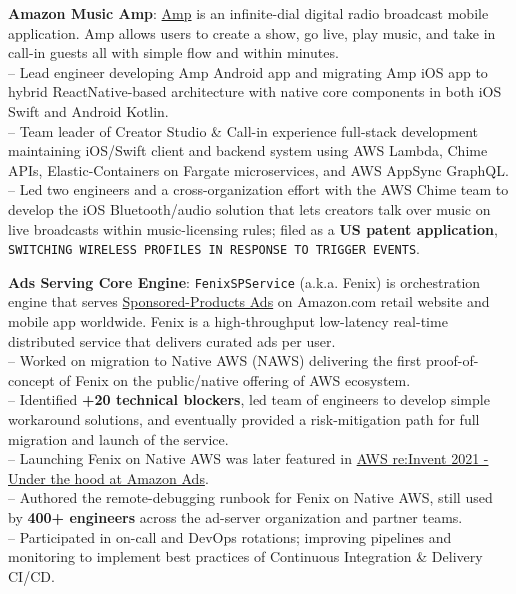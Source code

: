 \documentclass[letterpaper,11pt]{article}
\newcommand{\resumeItem}[2]{
  \item\small{
    \textbf{#1}{: #2\vspace{-2pt}}
  }
}
\begin{document}
		\resumeItem{Amazon Music Amp}
          {\href{https://techcrunch.com/2022/03/08/amazon-launches-a-live-radio-app-amp-which-lets-you-play-dj-with-the-amazon-music-catalog/}{Amp} is an infinite-dial digital radio broadcast mobile application. Amp allows users to create a show, go live, play music, and take in call-in guests all with simple flow and within minutes.\\
          -- Lead engineer developing Amp Android app and migrating Amp iOS app to hybrid ReactNative-based architecture with native core components in both iOS Swift and Android Kotlin.\\
          -- Team leader of Creator Studio \& Call-in experience full-stack development maintaining iOS/Swift client and backend system using AWS Lambda, Chime APIs, Elastic-Containers on Fargate microservices, and AWS AppSync GraphQL.\\
          -- Led two engineers and a cross-organization effort with the AWS Chime team to develop the iOS Bluetooth/audio solution that lets creators talk over music on live broadcasts within music-licensing rules; filed as a \textbf{US patent application}, \texttt{SWITCHING WIRELESS PROFILES IN RESPONSE TO TRIGGER EVENTS}.}          
		\resumeItem{Ads Serving Core Engine}
          {\texttt{FenixSPService} (a.k.a. Fenix) is orchestration engine that serves \href{https://advertising.amazon.com/solutions/products/sponsored-products}{Sponsored-Products Ads} on Amazon.com retail website and mobile app worldwide. Fenix is a high-throughput low-latency real-time distributed service that delivers curated ads per user.\\
          -- Worked on migration to Native AWS (NAWS) delivering the first proof-of-concept of Fenix on the public/native offering of AWS ecosystem.\\
          -- Identified \textbf{+20 technical blockers}, led team of engineers to develop simple workaround solutions, and eventually provided a risk-mitigation path for full migration and launch of the service.\\
          -- Launching Fenix on Native AWS was later featured in \href{https://youtu.be/BS4MPpEO66I?t=1067}{AWS re:Invent 2021 - Under the hood at Amazon Ads}.\\
          -- Authored the remote-debugging runbook for Fenix on Native AWS, still used by \textbf{400+ engineers} across the ad-server organization and partner teams.\\
          -- Participated in on-call and DevOps rotations; improving pipelines and monitoring to implement best practices of Continuous Integration \& Delivery CI/CD.}
\end{document}

